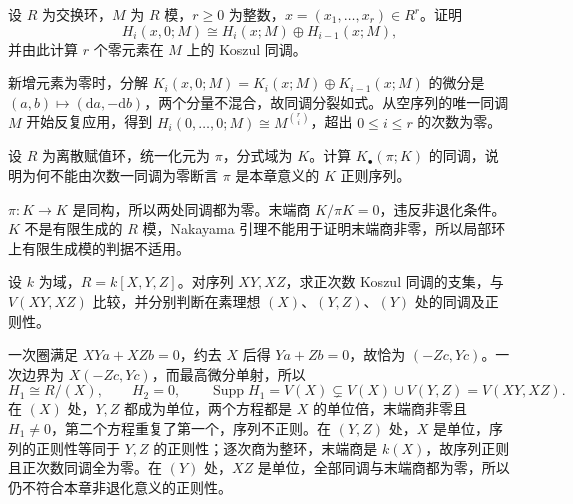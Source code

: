 \begin{exercise}\label{b3:ex:15-zero-generator-splitting}
	设 \(R\) 为交换环，\(M\) 为 \(R\) 模，\(r\ge0\) 为整数，\(x=(x_1,\ldots,x_r)\in R^r\)。证明
	\[
		H_i(x,0;M)\cong H_i(x;M)\oplus H_{i-1}(x;M),
	\]
	并由此计算 \(r\) 个零元素在 \(M\) 上的 Koszul 同调。
\end{exercise}
\begin{solution}
	新增元素为零时，分解 \(K_i(x,0;M)=K_i(x;M)\oplus K_{i-1}(x;M)\) 的微分是 \((a,b)\mapsto(\mathrm{d}a,-\mathrm{d}b)\)，两个分量不混合，故同调分裂如式。从空序列的唯一同调 \(M\) 开始反复应用，得到 \(H_i(0,\ldots,0;M)\cong M^{\binom ri}\)，超出 \(0\le i\le r\) 的次数为零。
\end{solution}

\begin{exercise}\label{b3:ex:15-infinite-module-caution}
	设 \(R\) 为离散赋值环，统一化元为 \(\pi\)，分式域为 \(K\)。计算 \(K_\bullet(\pi;K)\) 的同调，说明为何不能由次数一同调为零断言 \(\pi\) 是本章意义的 \(K\) 正则序列。
\end{exercise}
\begin{solution}
	\(\pi:K\rightarrow K\) 是同构，所以两处同调都为零。末端商 \(K/\pi K=0\)，违反非退化条件。\(K\) 不是有限生成的 \(R\) 模，Nakayama 引理不能用于证明末端商非零，所以局部环上有限生成模的判据不适用。
\end{solution}

\begin{exercise}\label{b3:ex:15-local-detection-obstruction}
	设 \(k\) 为域，\(R=k[X,Y,Z]\)。对序列 \(XY,XZ\)，求正次数 Koszul 同调的支集，与 \(V(XY,XZ)\) 比较，并分别判断在素理想 \((X)\)、\((Y,Z)\)、\((Y)\) 处的同调及正则性。
\end{exercise}
\begin{solution}
	一次圈满足 \(XYa+XZb=0\)，约去 \(X\) 后得 \(Ya+Zb=0\)，故恰为 \((-Zc,Yc)\)。一次边界为 \(X(-Zc,Yc)\)，而最高微分单射，所以
	\[
		H_1\cong R/(X),\qquad H_2=0,\qquad \operatorname{Supp}H_1=V(X)\subsetneq V(X)\cup V(Y,Z)=V(XY,XZ).
	\]
	在 \((X)\) 处，\(Y,Z\) 都成为单位，两个方程都是 \(X\) 的单位倍，末端商非零且 \(H_1\ne0\)，第二个方程重复了第一个，序列不正则。在 \((Y,Z)\) 处，\(X\) 是单位，序列的正则性等同于 \(Y,Z\) 的正则性；逐次商为整环，末端商是 \(k(X)\)，故序列正则且正次数同调全为零。在 \((Y)\) 处，\(XZ\) 是单位，全部同调与末端商都为零，所以仍不符合本章非退化意义的正则性。
\end{solution}
